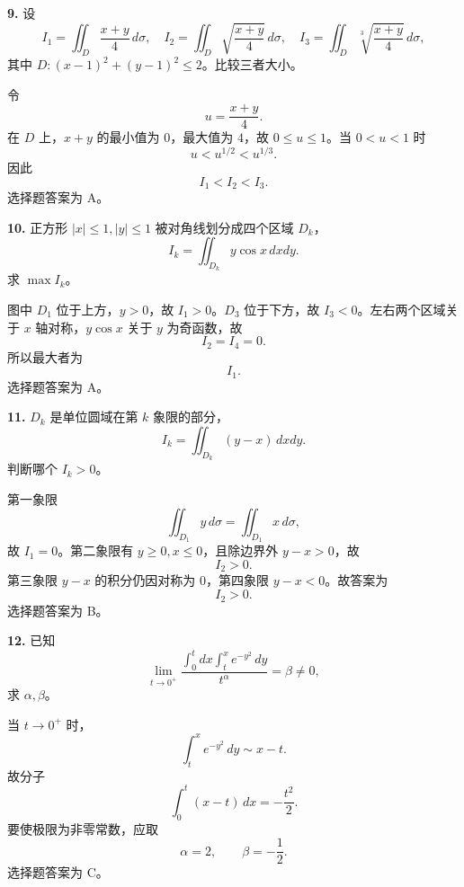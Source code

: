 \begin{problemblock}
\textbf{9.} 设
\[
I_1=\iint_D\frac{x+y}{4}\,d\sigma,\quad
I_2=\iint_D\sqrt{\frac{x+y}{4}}\,d\sigma,\quad
I_3=\iint_D\sqrt[3]{\frac{x+y}{4}}\,d\sigma,
\]
其中 \(D:(x-1)^2+(y-1)^2\le2\)。比较三者大小。
\end{problemblock}

\begin{solutionblock}
令
\[
u=\frac{x+y}{4}.
\]
在 \(D\) 上，\(x+y\) 的最小值为 \(0\)，最大值为 \(4\)，故 \(0\le u\le1\)。当 \(0<u<1\) 时
\[
u<u^{1/2}<u^{1/3}.
\]
因此
\[
\boxed{I_1<I_2<I_3}.
\]
选择题答案为 A。
\end{solutionblock}

\begin{problemblock}
\textbf{10.} 正方形 \(|x|\le1,|y|\le1\) 被对角线划分成四个区域 \(D_k\)，
\[
I_k=\iint_{D_k}y\cos x\,dxdy.
\]
求 \(\max I_k\)。
\end{problemblock}

\begin{solutionblock}
图中 \(D_1\) 位于上方，\(y>0\)，故 \(I_1>0\)。\(D_3\) 位于下方，故 \(I_3<0\)。左右两个区域关于 \(x\) 轴对称，\(y\cos x\) 关于 \(y\) 为奇函数，故
\[
I_2=I_4=0.
\]
所以最大者为
\[
\boxed{I_1}.
\]
选择题答案为 A。
\end{solutionblock}

\begin{problemblock}
\textbf{11.} \(D_k\) 是单位圆域在第 \(k\) 象限的部分，
\[
I_k=\iint_{D_k}(y-x)\,dxdy.
\]
判断哪个 \(I_k>0\)。
\end{problemblock}

\begin{solutionblock}
第一象限
\[
\iint_{D_1}y\,d\sigma=\iint_{D_1}x\,d\sigma,
\]
故 \(I_1=0\)。第二象限有 \(y\ge0,x\le0\)，且除边界外 \(y-x>0\)，故
\[
I_2>0.
\]
第三象限 \(y-x\) 的积分仍因对称为 \(0\)，第四象限 \(y-x<0\)。故答案为
\[
\boxed{I_2>0}.
\]
选择题答案为 B。
\end{solutionblock}

\begin{problemblock}
\textbf{12.} 已知
\[
\lim_{t\to0^+}\frac{\displaystyle\int_0^t dx\int_t^x e^{-y^2}\,dy}{t^\alpha}=\beta\ne0,
\]
求 \(\alpha,\beta\)。
\end{problemblock}

\begin{solutionblock}
当 \(t\to0^+\) 时，
\[
\int_t^x e^{-y^2}\,dy\sim x-t.
\]
故分子
\[
\int_0^t(x-t)\,dx=-\frac{t^2}{2}.
\]
要使极限为非零常数，应取
\[
\alpha=2,\qquad \beta=-\frac12.
\]
选择题答案为 C。
\end{solutionblock}

